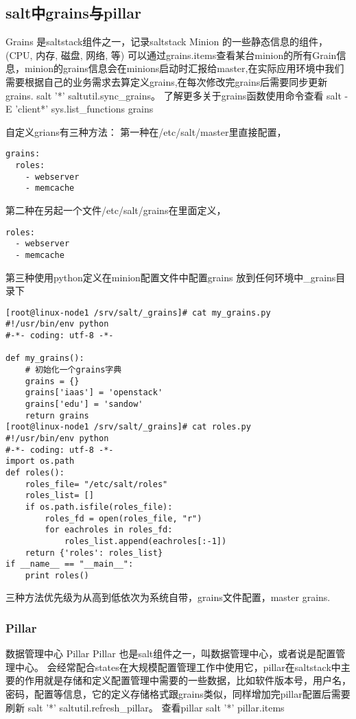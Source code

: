 \subsection{salt中grains与pillar}

Grains 是saltstack组件之一，记录saltstack Minion 的一些静态信息的组件，(CPU, 内存, 磁盘, 网络, 等) 可以通过grains.items查看某台minion的所有Grain信息，minion的grains信息会在minions启动时汇报给master,在实际应用环境中我们需要根据自己的业务需求去算定义grains,在每次修改完grains后需要同步更新grains.  salt '*' saltutil.sync_grains。 了解更多关于grains函数使用命令查看 salt -E 'client*' sys.list_functions grains

自定义grians有三种方法： 
第一种在/etc/salt/master里直接配置，

\begin{lstlisting}
grains:
  roles:
    - webserver
    - memcache
\end{lstlisting}

第二种在另起一个文件/etc/salt/grains在里面定义，

\begin{lstlisting}
roles:
  - webserver
  - memcache
\end{lstlisting}

第三种使用python定义在minion配置文件中配置grains 放到任何环境中_grains目录下

\begin{lstlisting}
[root@linux-node1 /srv/salt/_grains]# cat my_grains.py
#!/usr/bin/env python
#-*- coding: utf-8 -*-

def my_grains():
    # 初始化一个grains字典
    grains = {}
    grains['iaas'] = 'openstack'
    grains['edu'] = 'sandow'
    return grains
[root@linux-node1 /srv/salt/_grains]# cat roles.py
#!/usr/bin/env python
#-*- coding: utf-8 -*-
import os.path
def roles():
    roles_file= "/etc/salt/roles"
    roles_list= []
    if os.path.isfile(roles_file):
        roles_fd = open(roles_file, "r")
        for eachroles in roles_fd:
            roles_list.append(eachroles[:-1])
    return {'roles': roles_list}
if __name__ == "__main__":
    print roles()
\end{lstlisting}

三种方法优先级为从高到低依次为系统自带，grains文件配置，master grains. 
\subsubsection{Pillar}

数据管理中心 Pillar
Pillar 也是salt组件之一，叫数据管理中心，或者说是配置管理中心。 会经常配合states在大规模配置管理工作中使用它，pillar在saltstack中主要的作用就是存储和定义配置管理中需要的一些数据，比如软件版本号，用户名，密码，配置等信息，它的定义存储格式跟grains类似，同样增加完pillar配置后需要刷新 salt '*' saltutil.refresh_pillar。 查看pillar salt '*' pillar.items 
 
